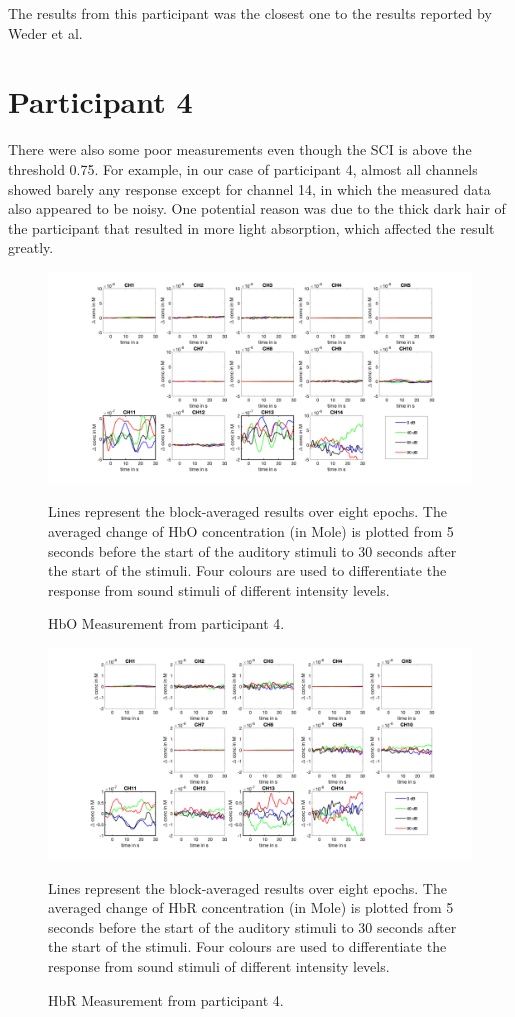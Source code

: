 The results from this participant was the closest one to the results reported by Weder et al. 
\newpage


\section {Participant 4}
There were also some poor measurements even though the SCI is above the threshold 0.75. For example, in our case of participant 4, almost all channels showed barely any response except for channel 14, in which the measured data also appeared to be noisy. One potential reason was due to the thick dark hair of the participant that resulted in more light absorption, which affected the result greatly.

\begin{figure}[H]
  \centering
    \includegraphics[scale=.35]{bilder/HbO_Mole/sub_lin_s_HbO.png}
  \caption{HbO Measurement from participant 4.}
  \medskip
  \footnotesize {Lines represent the block-averaged results over eight epochs. The averaged change of HbO concentration (in Mole) is plotted from 5 seconds before the start of the auditory stimuli to 30 seconds after the start of the stimuli. Four colours are used to differentiate the response from sound stimuli of different intensity levels.}
\end{figure}


\newpage


\begin{figure}[H]
  \centering
    \includegraphics[scale=.35]{bilder/HbR_Mole/sub_lin_s_HbR.png}
  \caption{HbR Measurement from participant 4.}
  \medskip
  \footnotesize {Lines represent the block-averaged results over eight epochs. The averaged change of HbR concentration (in Mole) is plotted from 5 seconds before the start of the auditory stimuli to 30 seconds after the start of the stimuli. Four colours are used to differentiate the response from sound stimuli of different intensity levels.}
\end{figure}

